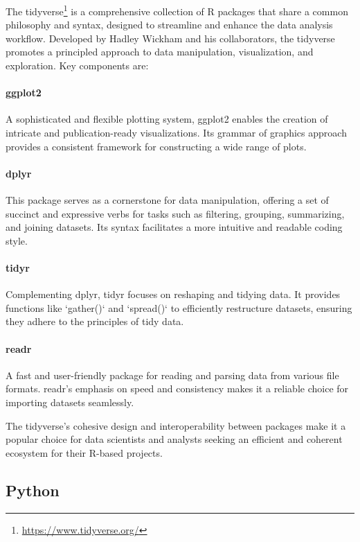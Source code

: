 The tidyverse\footnote{\url{https://www.tidyverse.org/}} is a comprehensive collection of R packages that share a common philosophy and syntax, designed to streamline and enhance the data analysis workflow. Developed by Hadley Wickham and his collaborators, the tidyverse promotes a principled approach to data manipulation, visualization, and exploration. Key components are:

\paragraph*{ggplot2} A sophisticated and flexible plotting system, ggplot2 enables the creation of intricate and publication-ready visualizations. Its grammar of graphics approach provides a consistent framework for constructing a wide range of plots.

\paragraph*{dplyr} This package serves as a cornerstone for data manipulation, offering a set of succinct and expressive verbs for tasks such as filtering, grouping, summarizing, and joining datasets. Its syntax facilitates a more intuitive and readable coding style.

\paragraph*{tidyr} Complementing dplyr, tidyr focuses on reshaping and tidying data. It provides functions like `gather()` and `spread()` to efficiently restructure datasets, ensuring they adhere to the principles of tidy data.

\paragraph*{readr} A fast and user-friendly package for reading and parsing data from various file formats. readr's emphasis on speed and consistency makes it a reliable choice for importing datasets seamlessly.

The tidyverse's cohesive design and interoperability between packages make it a popular choice for data scientists and analysts seeking an efficient and coherent ecosystem for their R-based projects.

\subsection*{Python}

